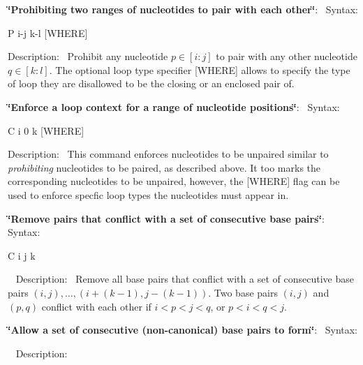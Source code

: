 \begin{DoxyEnumerate}
\item {\bfseries{\char`\"{}\+Prohibiting two ranges of nucleotides to pair with each other\char`\"{}}}\+:~\newline
 Syntax\+:\begin{DoxyVerb}P i-j k-l [WHERE] \end{DoxyVerb}
 Description\+:~\newline
 Prohibit any nucleotide $ p \in [i:j] $ to pair with any other nucleotide $ q \in [k:l] $. The optional loop type specifier {\ttfamily }\mbox{[}W\+H\+E\+RE\mbox{]} allows to specify the type of loop they are disallowed to be the closing or an enclosed pair of.
\item {\bfseries{\char`\"{}\+Enforce a loop context for a range of nucleotide positions\char`\"{}}}\+:~\newline
 Syntax\+:\begin{DoxyVerb}C i 0 k [WHERE] \end{DoxyVerb}
 Description\+:~\newline
 This command enforces nucleotides to be unpaired similar to {\itshape prohibiting} nucleotides to be paired, as described above. It too marks the corresponding nucleotides to be unpaired, however, the {\ttfamily }\mbox{[}W\+H\+E\+RE\mbox{]} flag can be used to enforce specfic loop types the nucleotides must appear in.
\item {\bfseries{\char`\"{}\+Remove pairs that conflict with a set of consecutive base pairs\char`\"{}}}\+:~\newline
 Syntax\+:\begin{DoxyVerb}C i j k \end{DoxyVerb}
~\newline
 Description\+:~\newline
 Remove all base pairs that conflict with a set of consecutive base pairs $ (i,j), \ldots, (i+(k-1), j-(k-1)) $. Two base pairs $ (i,j) $ and $ (p,q) $ conflict with each other if $ i < p < j < q $, or $ p < i < q < j $.
\item {\bfseries{\char`\"{}\+Allow a set of consecutive (non-\/canonical) base pairs to form\char`\"{}}}\+:~\newline
 Syntax\+:
\begin{DoxyCode}{0}
\end{DoxyCode}
~\newline
 Description\+:~\newline

\end{DoxyEnumerate}
